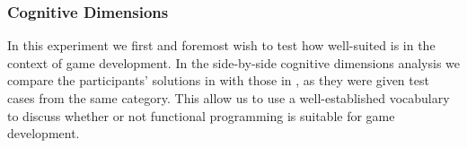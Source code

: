 \subsubsection{Cognitive Dimensions}
In this experiment we first and foremost wish to test how well-suited \fsh is in the context of game development. In the side-by-side cognitive dimensions analysis we compare the participants' solutions in \fsh with those in \csh, as they were given test cases from the same category. This allow us to use a well-established vocabulary to discuss whether or not functional programming is suitable for game development.

\begin{table}[H]
	\caption{Cognitive Dimensions Findings}
	\label{tab:cog-dim-findings}
\end{table}

